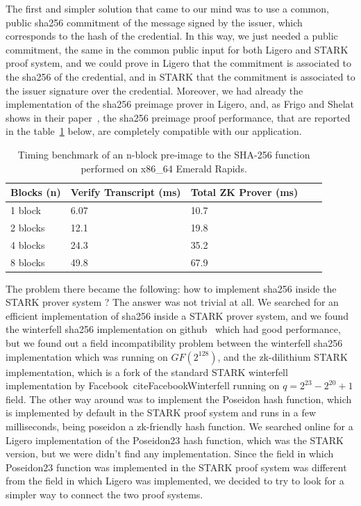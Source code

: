 \documentclass[binding=0.6cm,oneside,noexaminfo]{sapthesis}
\begin{document}
The first and simpler solution that came to our mind was to use a common, public sha256 commitment of the message signed by the issuer,
which corresponds to the hash of the credential. In this way, we just needed a public commitment, the same in the common public input
for both Ligero and STARK proof system, and we could prove in Ligero that the commitment is associated to the sha256 of the credential,
and in STARK that the commitment is associated to the issuer signature over the credential. Moreover, we had already the implementation
of the sha256 preimage prover in Ligero, and, as Frigo and Shelat shows in their paper~\cite{cryptoeprint:2024/2010}, the sha256 preimage
proof performance, that are reported in the table~\ref{tab:sha256_frigo_shelat} below, are completely compatible with our application.
\begin{table}[ht]
\centering
\caption{Timing benchmark of an n-block pre-image to the SHA-256 function performed on x86\_64 Emerald Rapids.}
\label{tab:sha256_frigo_shelat}
\small
\begin{tabularx}{\textwidth}{@{}l X X X X@{}}
\toprule
\textbf{Blocks (n)} & \textbf{Verify Transcript (ms)} & \textbf{Total ZK Prover (ms)} \\
\midrule
1 block  & 6.07  & 10.7 \\
2 blocks & 12.1  & 19.8 \\
4 blocks & 24.3  & 35.2 \\
8 blocks & 49.8  & 67.9 \\
\bottomrule
\end{tabularx}
\end{table}
The problem there became the following: how to implement sha256 inside the STARK prover system ? The answer was not trivial at all.
We searched for an efficient implementation of sha256 inside a STARK prover system, and we found the winterfell sha256 implementation
on github~\cite{iStrannikWinterfellSha256} which had good performance, but we found out a field incompatibility problem between the
winterfell sha256 implementation which was running on $GF(2^{128})$, and the zk-dilithium STARK implementation, which is a fork of 
the standard STARK winterfell implementation by Facebook~cite{FacebookWinterfell} running on $q = 2^{23} - 2^{20} + 1$ field.
The other way around was to implement the Poseidon hash function, which is implemented by default in the STARK proof system 
and runs in a few milliseconds, being poseidon a zk-friendly hash function. We searched online for a Ligero implementation of
the Poseidon23 hash function, which was the STARK version, but we were didn't find any implementation. Since the field in which
Poseidon23 function was implemented in the STARK proof system was different from the field in which Ligero was implemented, 
we decided to try to look for a simpler way to connect the two proof systems.
\end{document}
